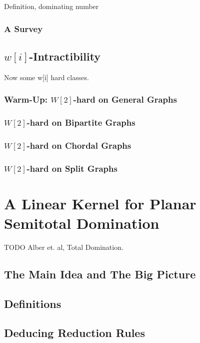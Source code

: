 Definition, dominating number

\subsection*{A Survey}

\section{\hmath $w[i]$-Intractibility}

Now some  w[i] hard classes. 

\subsection{Warm-Up: \hmath $W[2]$-hard on General Graphs}

\subsection{\hmath $W[2]$-hard on Bipartite Graphs}

\subsection{\hmath $W[2]$-hard on Chordal Graphs}

\subsection{\hmath $W[2]$-hard on Split Graphs}

\chapter{A Linear Kernel for Planar Semitotal Domination}

TODO Alber et. al, Total Domination. 

\section{The Main Idea and The Big Picture}
\section{Definitions}
\section{Deducing Reduction Rules}
